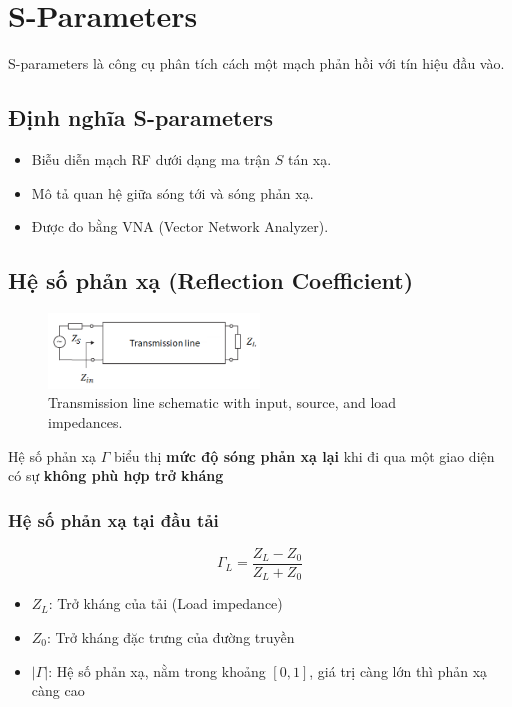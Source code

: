 \chapter{S-Parameters}
    S-parameters là công cụ phân tích cách một mạch phản hồi với tín hiệu đầu vào.

    \section{Định nghĩa S-parameters\cite{cadence2023sparams}}
        \begin{itemize}
            \item Biễu diễn mạch RF dưới dạng ma trận $S$ tán xạ.
            \item Mô tả quan hệ giữa sóng tới và sóng phản xạ.
            \item Được đo bằng VNA (Vector Network Analyzer).
        \end{itemize}

    \section{Hệ số phản xạ (Reflection Coefficient)}
        \begin{figure}[h]
            \centering
            \includegraphics[width=0.5\textwidth]{figures/transmission_line.png}
            \caption{Transmission line schematic with input, source, and load impedances.}
        \end{figure}
        Hệ số phản xạ $\Gamma$\cite{cadence2023sparams}\cite{cadence2021transmission} biểu thị \textbf{mức độ sóng phản xạ lại} khi đi qua một giao diện có sự \textbf{không phù hợp trở kháng}\par
        
        \subsection{Hệ số phản xạ tại đầu tải}
            $$\Gamma_L = \frac{Z_{L} - Z_0}{Z_{L} + Z_0}$$
            \begin{itemize}
                \item $Z_{L}$: Trở kháng của tải (Load impedance)
                \item $Z_0$: Trở kháng đặc trưng của đường truyền
                \item $|\Gamma|$: Hệ số phản xạ, nằm trong khoảng $\left[0,1\right]$, giá trị càng lớn thì phản xạ càng cao
            \end{itemize}
        
